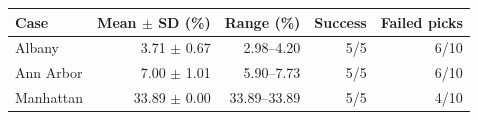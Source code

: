\begin{tabular}{lrrrr}
\toprule
Case & Mean $\pm$ SD (\%) & Range (\%) & Success & Failed picks \\
\midrule
Albany & 3.71 $\pm$ 0.67 & 2.98--4.20 & 5/5 & 6/10 \\
Ann Arbor & 7.00 $\pm$ 1.01 & 5.90--7.73 & 5/5 & 6/10 \\
Manhattan & 33.89 $\pm$ 0.00 & 33.89--33.89 & 5/5 & 4/10 \\
\bottomrule
\end{tabular}